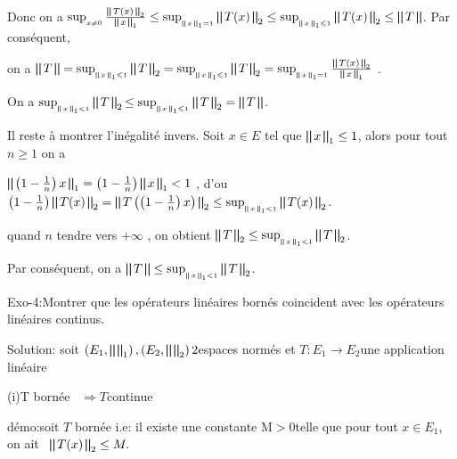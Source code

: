 \documentclass{article}
\begin{document}
Donc on a $\sup_{_{x \neq 0}}  \frac{\bigparallel T (x)
\bigparallel_2}{\bigparallel x \bigparallel_1} \leq \sup_{_{\bigparallel x
\bigparallel_1 = 1}}  \bigparallel T (x) \bigparallel_2 \leq
\sup_{_{\bigparallel x \bigparallel_1 \leqslant 1}}  \bigparallel T (x)
\bigparallel_2 \leq \bigparallel T \bigparallel$. Par cons{\'e}quent,

on a $\bigparallel T \bigparallel = \sup_{_{\bigparallel x \bigparallel_1
\leqslant 1}} \bigparallel T \bigparallel_2 = \sup_{_{\bigparallel x
\bigparallel_1 \leqslant 1}} \bigparallel T \bigparallel_2 =
\sup_{_{\bigparallel x \bigparallel_1 = 1}}  \frac{\bigparallel T (x)
\bigparallel_2}{\bigparallel x \bigparallel_1}$ .

On a $\sup_{_{\bigparallel x \bigparallel_1 < 1}}  \bigparallel T
\bigparallel_2 {\leq \sup_{_{\bigparallel x \bigparallel_1 \leqslant 1}}}_{} 
\bigparallel T \bigparallel_2 = \bigparallel T \bigparallel $.

Il reste {\`a} montrer l'in{\'e}galit{\'e} invers. Soit $x \in E  $ tel que
$\bigparallel x \bigparallel_1 \leq 1$, alors pour tout $n \geq 1$ on a

$\bigparallel \left( 1 - \frac{1}{n} \right) x \bigparallel_1 = \left( 1 -
\frac{1}{n} \right) \bigparallel x \bigparallel_1 < 1$ , d'ou $\left( 1 -
\frac{1}{n} \right) \bigparallel T (x) \bigparallel_2 = \bigparallel T \left(
\left( 1 - \frac{1}{n} \right) x \right) \bigparallel_2 \leq
\sup_{_{\bigparallel x \bigparallel_1 < 1}}  \bigparallel T (x)
\bigparallel_2$.

quand $n$ tendre vers $+ \infty$ , on obtient $\bigparallel T \bigparallel_2
\leq \sup_{_{\bigparallel x \bigparallel_1 < 1}} \bigparallel T
\bigparallel_2$.

Par cons{\'e}quent, on a $\bigparallel T \bigparallel \leq
\sup_{_{\bigparallel x \bigparallel_1 < 1}}  \bigparallel T \bigparallel_2$.

Exo-4:Montrer que les op{\'e}rateurs lin{\'e}aires born{\'e}s coincident avec
les op{\'e}rateurs lin{\'e}aires continus.

Solution: soit $\left( E_1, \bigparallel \bigparallel_1 \right), \left( E_2,
\bigparallel \bigparallel_2 \right) 2$espaces norm{\'e}s et $T : E_1
\rightarrow E_2 $une application lin{\'e}aire

(i)T born{\'e}e \ $\Rightarrow T$continue

d{\'e}mo:soit $T$ born{\'e}e i.e: il existe une constante M$> 0$telle que pour
tout $x \in E_1$, on ait \ $\bigparallel T (x) \bigparallel_2 \leq M.$
\end{document}
